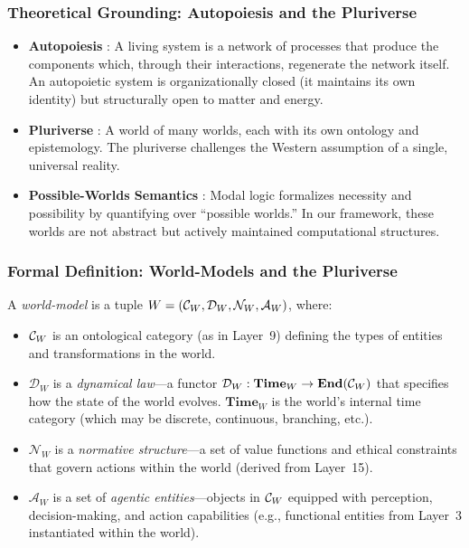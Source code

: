 \subsubsection{Theoretical Grounding: Autopoiesis and the Pluriverse}
\begin{itemize}
    \item \textbf{Autopoiesis} \cite{maturana1980, varela1979}: A living system is a network of processes that produce the components which, through their interactions, regenerate the network itself. An autopoietic system is organizationally closed (it maintains its own identity) but structurally open to matter and energy.
    \item \textbf{Pluriverse} \cite{escobar2018}: A world of many worlds, each with its own ontology and epistemology. The pluriverse challenges the Western assumption of a single, universal reality.
    \item \textbf{Possible-Worlds Semantics} \cite{lewis1986}: Modal logic formalizes necessity and possibility by quantifying over ``possible worlds.'' In our framework, these worlds are not abstract but actively maintained computational structures.
\end{itemize}

\subsubsection{Formal Definition: World-Models and the Pluriverse}
\begin{definition}
A \emph{world-model} is a tuple $W = (\mathcal{C}_W, \mathcal{D}_W, \mathcal{N}_W, \mathcal{A}_W)$, where:
\begin{itemize}
    \item $\mathcal{C}_W$ is an ontological category (as in Layer~9) defining the types of entities and transformations in the world.
    \item $\mathcal{D}_W$ is a \emph{dynamical law}—a functor $\mathcal{D}_W: \mathbf{Time}_W \to \mathbf{End}(\mathcal{C}_W)$ that specifies how the state of the world evolves. $\mathbf{Time}_W$ is the world's internal time category (which may be discrete, continuous, branching, etc.).
    \item $\mathcal{N}_W$ is a \emph{normative structure}—a set of value functions and ethical constraints that govern actions within the world (derived from Layer~15).
    \item $\mathcal{A}_W$ is a set of \emph{agentic entities}—objects in $\mathcal{C}_W$ equipped with perception, decision-making, and action capabilities (e.g., functional entities from Layer~3 instantiated within the world).
\end{itemize}
\end{definition}

